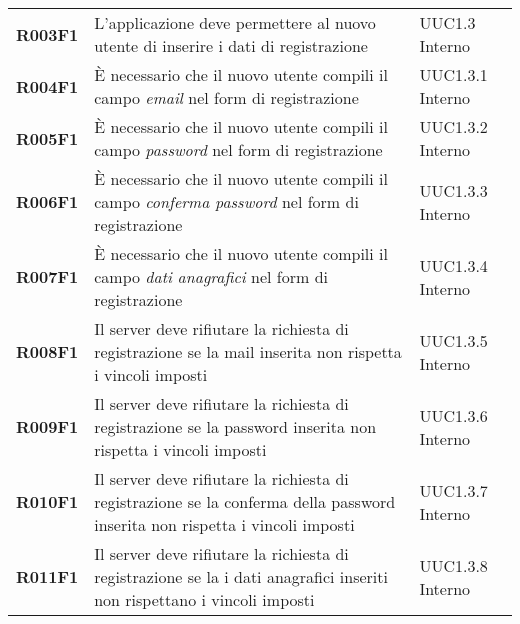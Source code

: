 \documentclass[../analisi-dei-requisiti.tex]{subfiles}
\begin{document}
\begin{longtable}[H]{>{\centering\bfseries}m{3cm} >{\centering}m{10cm} >{\centering\arraybackslash}m{3cm}}
  R003F1                               & L'applicazione deve permettere al nuovo utente di inserire i dati di registrazione                                                                                                                      & UUC1.3 Interno                \\
  R004F1                               & È necessario che il nuovo utente compili il campo \textit{email} nel form di registrazione                                                                                                              & UUC1.3.1 Interno              \\
  R005F1                               & È necessario che il nuovo utente compili il campo \textit{password} nel form di registrazione                                                                                                           & UUC1.3.2 Interno              \\
  R006F1                               & È necessario che il nuovo utente compili il campo \textit{conferma password} nel form di registrazione                                                                                                  & UUC1.3.3 Interno              \\
  R007F1                               & È necessario che il nuovo utente compili il campo \textit{dati anagrafici} nel form di registrazione                                                                                                    & UUC1.3.4 Interno              \\
  R008F1                               & Il server deve rifiutare la richiesta di registrazione se la mail inserita non rispetta i vincoli imposti                                                                                               & UUC1.3.5 Interno              \\
  R009F1                               & Il server deve rifiutare la richiesta di registrazione se la password inserita non rispetta i vincoli imposti                                                                                           & UUC1.3.6 Interno              \\
  R010F1                               & Il server deve rifiutare la richiesta di registrazione se la conferma della password inserita non rispetta i vincoli imposti                                                                            & UUC1.3.7 Interno              \\
  R011F1                               & Il server deve rifiutare la richiesta di registrazione se la i dati anagrafici inseriti non rispettano i vincoli imposti                                                                                & UUC1.3.8 Interno              \\

\end{longtable}
\end{document}
